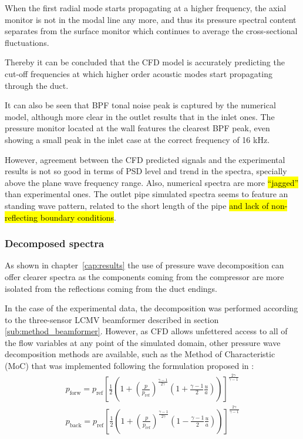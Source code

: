 When the first radial mode starts propagating at a higher frequency, the axial monitor is not in the modal line any more, and thus its pressure spectral content separates from the surface monitor which continues to average the cross-sectional fluctuations.

Thereby it can be concluded that the CFD model is accurately predicting the cut-off frequencies at which higher order acoustic modes start propagating through the duct.

It can also be seen that BPF tonal noise peak is captured by the numerical model, although more clear in the outlet results that in the inlet ones. The pressure monitor located at the wall features the clearest BPF peak, even showing a small peak in the inlet case at the correct frequency of 16 kHz.

However, agreement between the CFD predicted signals and the experimental results is not so good in terms of PSD level and trend in the spectra, specially above the plane wave frequency range. Also, numerical spectra are more \hl{``jagged''} than experimental ones. The outlet pipe simulated spectra seems to feature an standing wave pattern, related to the short length of the pipe \hl{and lack of non-reflecting boundary conditions}.

\subsubsection{Decomposed spectra}

As shown in chapter~\ref{cap:results} the use of pressure wave decomposition can offer clearer spectra as the components coming from the compressor are more isolated from the reflections coming from the duct endings. 

In the case of the experimental data, the decomposition was performed according to the three-sensor LCMV beamformer described in section \ref{sub:method_beamformer}. However, as CFD allows unfettered access to all of the flow variables at any point of the simulated domain, other pressure wave decomposition methods are available, such as the Method of Characteristic (MoC) that was implemented following the formulation proposed in \cite{payri1995acoustic,torregrosa2012development,galindo2010coupling}: 
\begin{eqnarray}\label{eq:descomposicion}
p_\text{forw}=p_\text{ref}\left[ \frac{1}{2}\left(1+\left(\frac{p}{p_\text{ref}}\right)^{\frac{\gamma-1}{2\gamma}}\left(1+\frac{\gamma-1}{2}\frac{u}{a}\right)\right) \right]^{\frac{2\gamma}{\gamma-1}}\\
p_\text{back}=p_\text{ref}\left[ \frac{1}{2}\left(1+\left(\frac{p}{p_\text{ref}}\right)^{\frac{\gamma-1}{2\gamma}}\left(1-\frac{\gamma-1}{2}\frac{u}{a}\right)\right) \right]^{\frac{2\gamma}{\gamma-1}}\nonumber
\end{eqnarray}

